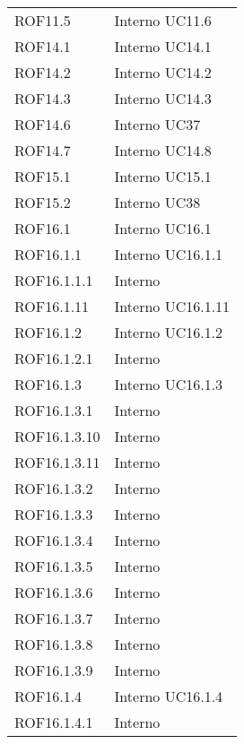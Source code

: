 \begin{longtable}{p{2.5cm}!{\VRule[1pt]}p{2.5cm}}
	\\
	ROF11.5 & Interno \newline UC11.6
	\\
	ROF14.1 & Interno \newline UC14.1
	\\
	ROF14.2 & Interno \newline UC14.2
	\\
	ROF14.3 & Interno \newline UC14.3
	\\
	ROF14.6 & Interno \newline UC37
	\\
	ROF14.7 & Interno \newline UC14.8
	\\
	ROF15.1 & Interno \newline UC15.1
	\\
	ROF15.2 & Interno \newline UC38
	\\
	ROF16.1 & Interno \newline UC16.1
	\\
	ROF16.1.1 & Interno \newline UC16.1.1
	\\
	ROF16.1.1.1 & Interno \\
	ROF16.1.11 & Interno \newline UC16.1.11
	\\
	ROF16.1.2 & Interno \newline UC16.1.2
	\\
	ROF16.1.2.1 & Interno \\
	ROF16.1.3 & Interno \newline UC16.1.3
	\\
	ROF16.1.3.1 & Interno \\
	ROF16.1.3.10 & Interno \\
	ROF16.1.3.11 & Interno \\
	ROF16.1.3.2 & Interno \\
	ROF16.1.3.3 & Interno \\
	ROF16.1.3.4 & Interno \\
	ROF16.1.3.5 & Interno \\
	ROF16.1.3.6 & Interno \\
	ROF16.1.3.7 & Interno \\
	ROF16.1.3.8 & Interno \\
	ROF16.1.3.9 & Interno \\
	ROF16.1.4 & Interno \newline UC16.1.4
	\\
	ROF16.1.4.1 & Interno \\

\end{longtable}
